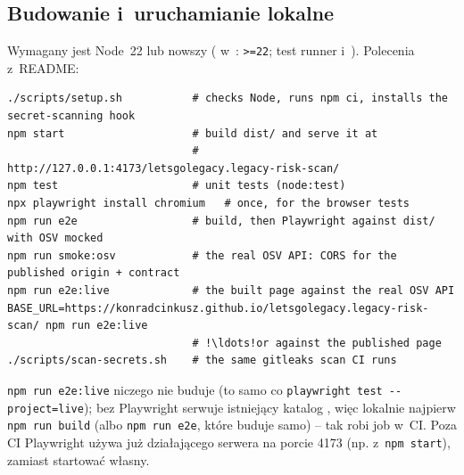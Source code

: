 \subsection{Budowanie i~uruchamianie lokalne}\label{sec:risk-scan-lokalnie}

Wymagany jest Node~22 lub nowszy ( w~: \texttt{>=22};
test runner i~). Polecenia z~README:

\begin{lstlisting}[escapechar=!]
./scripts/setup.sh           # checks Node, runs npm ci, installs the secret-scanning hook
npm start                    # build dist/ and serve it at
                             # http://127.0.0.1:4173/letsgolegacy.legacy-risk-scan/
npm test                     # unit tests (node:test)
npx playwright install chromium   # once, for the browser tests
npm run e2e                  # build, then Playwright against dist/ with OSV mocked
npm run smoke:osv            # the real OSV API: CORS for the published origin + contract
npm run e2e:live             # the built page against the real OSV API
BASE_URL=https://konradcinkusz.github.io/letsgolegacy.legacy-risk-scan/ npm run e2e:live
                             # !\ldots!or against the published page
./scripts/scan-secrets.sh    # the same gitleaks scan CI runs
\end{lstlisting}

\texttt{npm run e2e:live} niczego nie buduje (to samo co \texttt{playwright test
-{}-project=live}); bez  Playwright serwuje istniejący katalog
, więc lokalnie najpierw \texttt{npm run build} (albo \texttt{npm run e2e},
które buduje samo) -- tak robi job  w~CI. Poza CI Playwright używa już
działającego serwera na porcie 4173 (np. z~\texttt{npm start}), zamiast startować własny.

